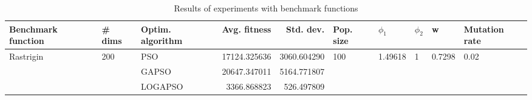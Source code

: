 \begin{table}
\centering
\caption{Results of experiments with benchmark functions}
\begin{tabular}{lllrrlllll}
\toprule
        Benchmark function &              \# dims & Optim. algorithm &  Avg. fitness &   Std. dev. &            Pop. size &               $\phi_{1}$ &         $\phi_{2}$ &                       w &         Mutation rate \\
\midrule
\multirow{3}{*}{Rastrigin} & \multirow{3}{*}{200} &              PSO &  17124.325636 & 3060.604290 & \multirow{3}{*}{100} & \multirow{3}{*}{1.49618} & \multirow{3}{*}{1} & \multirow{3}{*}{0.7298} & \multirow{3}{*}{0.02} \\
                           &                      &            GAPSO &  20647.347011 & 5164.771807 &                      &                          &                    &                         &                       \\
                           &                      &          LOGAPSO &   3366.868823 &  526.497809 &                      &                          &                    &                         &                       \\
\bottomrule
\end{tabular}
\end{table}
